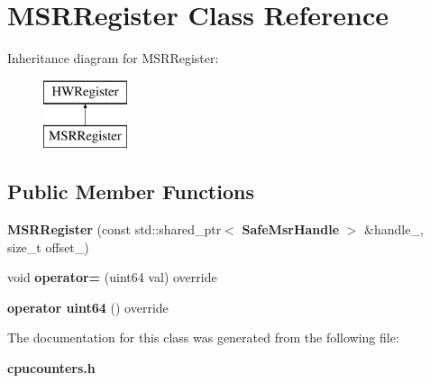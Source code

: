 \section{M\+S\+R\+Register Class Reference}
\label{classMSRRegister}
Inheritance diagram for M\+S\+R\+Register\+:\begin{figure}[H]
\begin{center}
\leavevmode
\includegraphics[height=2.000000cm]{classMSRRegister}
\end{center}
\end{figure}
\subsection*{Public Member Functions}
\begin{DoxyCompactItemize}
\item 
\mbox{\label{classMSRRegister_af4205decca0c01cf30e71a52d7a082cc}} 
{\bfseries M\+S\+R\+Register} (const std\+::shared\+\_\+ptr$<$ \textbf{ Safe\+Msr\+Handle} $>$ \&handle\+\_\+, size\+\_\+t offset\+\_\+)
\item 
\mbox{\label{classMSRRegister_abefffe54baca4e1d9884d932b71b48e2}} 
void {\bfseries operator=} (uint64 val) override
\item 
\mbox{\label{classMSRRegister_afbab0319545f44bfbd6659a38774fb1f}} 
{\bfseries operator uint64} () override
\end{DoxyCompactItemize}


The documentation for this class was generated from the following file\+:\begin{DoxyCompactItemize}
\item 
\textbf{ cpucounters.\+h}\end{DoxyCompactItemize}
